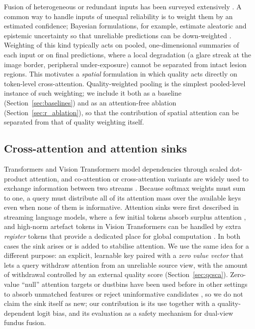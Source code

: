 \documentclass[final,5p,times,twocolumn,authoryear]{elsarticle}
\theoremstyle{plain}
\theoremstyle{remark}
\begin{document}
Fusion of heterogeneous or redundant inputs has been surveyed extensively \citep{Baltrusaitis2018,Su2019multiview}. A common way to handle inputs of unequal reliability is to weight them by an estimated confidence; Bayesian formulations, for example, estimate aleatoric and epistemic uncertainty so that unreliable predictions can be down-weighted \citep{Kendall2017}. Weighting of this kind typically acts on pooled, one-dimensional summaries of each input or on final predictions, where a local degradation (a glare streak at the image border, peripheral under-exposure) cannot be separated from intact lesion regions. This motivates a \emph{spatial} formulation in which quality acts directly on token-level cross-attention. Quality-weighted pooling is the simplest pooled-level instance of such weighting; we include it both as a baseline (Section~\ref{sec:baselines}) and as an attention-free ablation (Section~\ref{sec:r_ablation}), so that the contribution of spatial attention can be separated from that of quality weighting itself.

\subsection{Cross-attention and attention sinks}
\label{sec:rw-attention}

Transformers \citep{Vaswani2017} and Vision Transformers \citep{Dosovitskiy2021} model dependencies through scaled dot-product attention, and co-attention or cross-attention variants are widely used to exchange information between two streams \citep{Lu2019coattn,Tsai2019multimodal}. Because softmax weights must sum to one, a query must distribute all of its attention mass over the available keys even when none of them is informative. Attention sinks were first described in streaming language models, where a few initial tokens absorb surplus attention \citep{Xiao2023sink}, and high-norm artefact tokens in Vision Transformers can be handled by extra \emph{register} tokens that provide a dedicated place for global computation \citep{Zhai2023registers}. In both cases the sink arises or is added to stabilise attention. We use the same idea for a different purpose: an explicit, learnable key paired with a \emph{zero value vector} that lets a query withdraw attention from an unreliable source view, with the amount of withdrawal controlled by an external quality score (Section~\ref{sec:qcsca}). Zero-value ``null'' attention targets or dustbins have been used before in other settings to absorb unmatched features or reject uninformative candidates \citep[e.g.,][]{Sukhbaatar2015memory,Sarlin2020superglue}, so we do not claim the sink itself as new; our contribution is its use together with a quality-dependent logit bias, and its evaluation as a safety mechanism for dual-view fundus fusion.
\end{document}

